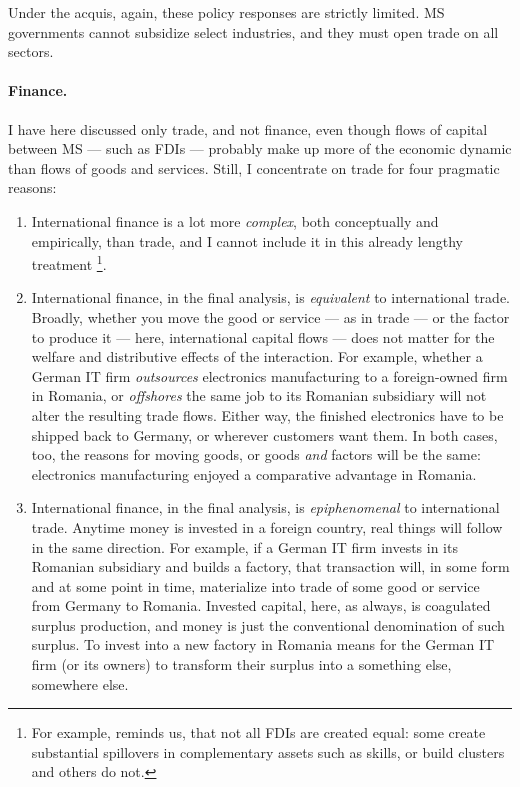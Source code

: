 \documentclass[11pt,a4paper,oneside]{article}
\begin{document}
Under the acquis, again, these policy responses are strictly limited. 
\gls{MS} governments cannot subsidize select industries, and they must open trade on all sectors.

\paragraph{Finance.} 
I have here discussed only trade, and not finance, even though flows of capital between \gls{MS} --- such as \glspl{FDI} --- probably make up more of the economic dynamic than flows of goods and services. 
Still, I concentrate on trade for four pragmatic reasons:
\begin{enumerate}
	\item International finance is a lot more \emph{complex}, both conceptually and empirically, than trade, and I cannot include it in this already lengthy treatment
		\footnote{
			For example, \cite{Narula2005} reminds us, that not all \glspl{FDI} are created equal: 
			some create substantial spillovers in complementary assets such as skills, or build clusters and others do not.
		}.
	\item International finance, in the final analysis, is \emph{equivalent} to international trade. 
	Broadly, whether you move the good or service --- as in trade --- or the factor to produce it --- here, international capital flows --- does not matter for the welfare and distributive effects of the interaction. 
	For example, whether a German IT firm \emph{outsources} electronics manufacturing to a foreign-owned firm in Romania, or \emph{offshores} the same job to its Romanian subsidiary will not alter the resulting trade flows. 
	Either way, the finished electronics have to be shipped back to Germany, or wherever customers want them. 
	In both cases, too, the reasons for moving goods, or goods \emph{and} factors will be the same: 
	electronics manufacturing enjoyed a comparative advantage in Romania.
	\item International finance, in the final analysis, is \emph{epiphenomenal} to international trade. 
	Anytime money is invested in a foreign country, real things will follow in the same direction. 
	For example, if a German IT firm invests in its Romanian subsidiary and builds a factory, that transaction will, in some form and at some point in time, materialize into trade of some good or service from Germany to Romania. 
	Invested capital, here, as always, is coagulated surplus production, and money is just the conventional denomination of such surplus. 
	To invest into a new factory in Romania means for the German IT firm (or its owners) to transform their surplus into a something else, somewhere else. 

\end{enumerate}
\end{document}
